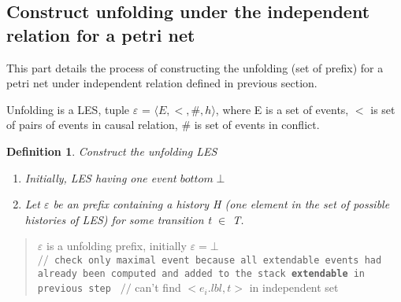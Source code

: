 \documentclass[11pt]{article}
\newtheorem{definition}{Definition}
\begin{document}
\subsection{Construct unfolding under the independent relation for a petri net}
	This part details the process of constructing the unfolding (set of prefix) for a petri net under independent 			relation defined in previous section.
	
	Unfolding is a LES, tuple $\varepsilon$ = $\langle E,<,\#,h\rangle$, where E is a set of events, $<$ is set of 			pairs of events in causal relation, $\#$ is set of events in conflict.
	
	\begin{definition}{Construct the unfolding LES}
	
	\begin{enumerate}
		\item Initially, LES having one event $bottom \perp$
		
		\item Let $\varepsilon$ be an prefix containing a history H (one element in the set of possible histories of 				LES) for some transition t $\in$ T.
		
	\end{enumerate}
	\end{definition}
	
	\begin{verse}
		$\varepsilon$ is a unfolding prefix, initially $\varepsilon=\bot$\\
		\texttt{$//$ check only maximal event because all extendable events had already been computed and added 					to the stack \textbf{extendable} in previous step } 
		$//$ can't find $<e_i.lbl,t>$ in independent set

	\end{verse}


\begin{algorithm}
\caption{Extend LES}
\begin{algorithmic}[1]
		\Else
		\EndIf
	\EndWhile
	\EndProcedure
\end{algorithmic}
\end{algorithm}
\end{document}
